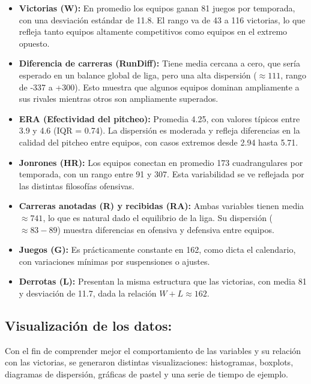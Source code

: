 \documentclass[man,floatsintext]{apa7}
\begin{document}
\begin{itemize}
    \item \textbf{Victorias (W):} En promedio los equipos ganan 81 juegos por temporada, con una desviación estándar de 11.8. El rango va de 43 a 116 victorias, lo que refleja tanto equipos altamente competitivos como equipos en el extremo opuesto.
    \item \textbf{Diferencia de carreras (RunDiff):} Tiene media cercana a cero, que sería esperado en un balance global de liga, pero una alta dispersión ($\approx 111$, rango de -337 a +300). Esto muestra que algunos equipos dominan ampliamente a sus rivales mientras otros son ampliamente superados.
    \item \textbf{ERA (Efectividad del pitcheo):} Promedia 4.25, con valores típicos entre 3.9 y 4.6 (IQR = 0.74). La dispersión es moderada y refleja diferencias en la calidad del pitcheo entre equipos, con casos extremos desde 2.94 hasta 5.71.
    \item \textbf{Jonrones (HR):} Los equipos conectan en promedio 173 cuadrangulares por temporada, con un rango entre 91 y 307. Esta variabilidad se ve reflejada por las distintas filosofías ofensivas.
    \item \textbf{Carreras anotadas (R) y recibidas (RA):} Ambas variables tienen media $\approx 741$, lo que es natural dado el equilibrio de la liga. Su dispersión ($\approx 83-89$) muestra diferencias en ofensiva y defensiva entre equipos.
    \item \textbf{Juegos (G):} Es prácticamente constante en 162, como dicta el calendario, con variaciones mínimas por suspensiones o ajustes.
    \item \textbf{Derrotas (L):} Presentan la misma estructura que las victorias, con media 81 y desviación de 11.7, dada la relación \(W+L \approx 162\).
\end{itemize}
\subsection{Visualización de los datos:}

Con el fin de comprender mejor el comportamiento de las variables y su relación con las victorias, se generaron distintas visualizaciones: histogramas, boxplots, diagramas de dispersión, gráficas de pastel y una serie de tiempo de ejemplo.
\end{document}
